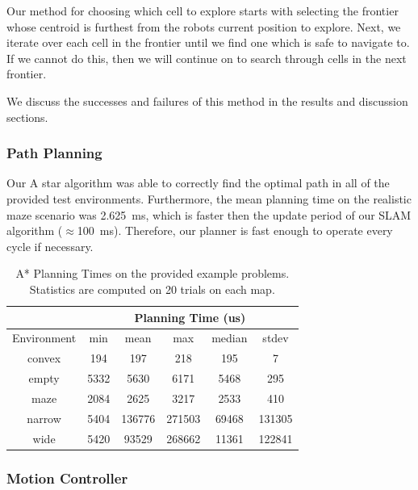\documentclass[journal]{IEEEtran}
\begin{document}
        Our method for choosing which cell to explore starts with selecting the frontier whose centroid is furthest from the robots current position to explore. Next, we iterate over each cell in the frontier until we find one which is safe to navigate to. If we cannot do this, then we will continue on to search through cells in the next frontier.
        
        We discuss the successes and failures of this method in the results and discussion sections.
        
        \subsubsection{Path Planning}
        
        Our A star algorithm was able to correctly find the optimal path in all of the provided test environments. Furthermore, the mean planning time on the realistic maze scenario was \SI{2.625}{\milli\second}, which is faster then the update period of our SLAM algorithm ($\approx$\SI{100}{\milli\second}). Therefore, our planner is fast enough to operate every cycle if necessary.
        
        \begin{table}
            \centering
            \begin{tabular}{|c|c|c|c|c|c|} \hline
                & \multicolumn{5}{c|}{Planning Time (us)} \\ \hline
                Environment & min & mean & max & median & stdev \\ \hline
                convex & 194 & 197 & 218 & 195 & 7 \\ \hline
                empty & 5332 & 5630 & 6171 & 5468 & 295 \\ \hline
                maze & 2084 & 2625 & 3217 & 2533 & 410 \\ \hline
                narrow & 5404 & 136776 & 271503 & 69468 & 131305 \\ \hline
                wide & 5420 & 93529 & 268662 & 11361 & 122841 \\ \hline
            \end{tabular}
            \caption{A* Planning Times on the provided example problems. Statistics are computed on 20 trials on each map.}
            \label{tab:a_star_times}
        \end{table}
        
        \subsubsection{Motion Controller}
        
\end{document}
